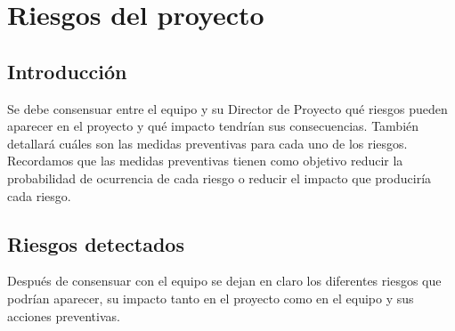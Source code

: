 \newpage

\section{Riesgos del proyecto}

\subsection{Introducción}
Se debe consensuar entre el equipo y su Director de Proyecto qué riesgos pueden aparecer en el proyecto y qué impacto tendrían sus consecuencias. También detallará cuáles son las medidas preventivas para cada uno de los riesgos. Recordamos que las medidas preventivas tienen como objetivo reducir la probabilidad de ocurrencia de cada riesgo o reducir el impacto que produciría cada riesgo.

\subsection{Riesgos detectados}
Después de consensuar con el equipo se dejan en claro los diferentes riesgos que podrían aparecer, su impacto tanto en el proyecto como en el equipo y sus acciones preventivas.

